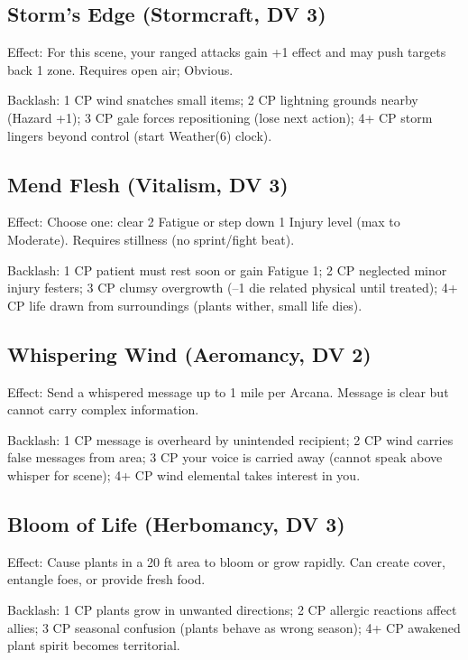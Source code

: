 \subsection{Storm's Edge (Stormcraft, DV 3)}
Effect: For this scene, your ranged attacks gain +1 effect and may push targets back 1 zone. Requires open air; Obvious.

Backlash: 1 CP wind snatches small items; 2 CP lightning grounds nearby (Hazard +1); 3 CP gale forces repositioning (lose next action); 4+ CP storm lingers beyond control (start Weather(6) clock).

\subsection{Mend Flesh (Vitalism, DV 3)}
Effect: Choose one: clear 2 Fatigue or step down 1 Injury level (max to Moderate). Requires stillness (no sprint/fight beat).

Backlash: 1 CP patient must rest soon or gain Fatigue 1; 2 CP neglected minor injury festers; 3 CP clumsy overgrowth (--1 die related physical until treated); 4+ CP life drawn from surroundings (plants wither, small life dies).

\subsection{Whispering Wind (Aeromancy, DV 2)}
Effect: Send a whispered message up to 1 mile per Arcana. Message is clear but cannot carry complex information.

Backlash: 1 CP message is overheard by unintended recipient; 2 CP wind carries false messages from area; 3 CP your voice is carried away (cannot speak above whisper for scene); 4+ CP wind elemental takes interest in you.

\subsection{Bloom of Life (Herbomancy, DV 3)}
Effect: Cause plants in a 20 ft area to bloom or grow rapidly. Can create cover, entangle foes, or provide fresh food.

Backlash: 1 CP plants grow in unwanted directions; 2 CP allergic reactions affect allies; 3 CP seasonal confusion (plants behave as wrong season); 4+ CP awakened plant spirit becomes territorial.

